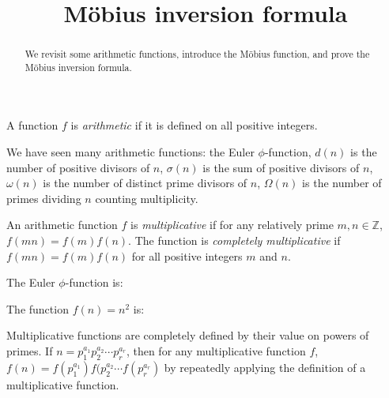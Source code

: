 \documentclass{ximera}
\title{M\"obius inversion formula}
\begin{document}
  
\begin{abstract}  
We revisit some arithmetic functions, introduce the M\"obius function, and prove the M\"obius inversion formula.\end{abstract}  
\maketitle  

\begin{definition}
 A function $f$ is \emph{arithmetic} if it is defined on all positive integers.
\end{definition}

We have seen many arithmetic functions: the Euler $\phi$-function, $d(n)$ is the number of positive divisors of $n$, $\sigma(n)$ is the sum of positive divisors of $n$, $\omega(n)$ is the number of distinct prime divisors of $n$, $\Omega(n)$ is the number of primes dividing $n$ counting multiplicity.

\begin{definition}
 An arithmetic function $f$ is \emph{multiplicative} if for any relatively prime $m,n\in\mathbb{Z}$, $f(mn)=f(m)f(n)$. The function is \emph{completely multiplicative} if $f(mn)=f(m)f(n)$ for all positive integers $m$  and $n$.
\end{definition}

\begin{question}
The Euler $\phi$-function is:
\begin{multipleChoice}
\end{multipleChoice}

The function $f(n)=n^2$ is: 
\begin{multipleChoice}
\end{multipleChoice}
\end{question}

Multiplicative functions are completely defined by their value on powers of primes. If $n=p_1^{a_1}p_2^{a_2}\cdots p_r^{a_r}$, then for any multiplicative function $f$, $f(n)=f(p_1^{a_1})f(p_2^{a_2}\cdots f(p_r^{a_r})$ by repeatedly applying the definition of a multiplicative function.
\end{document}
